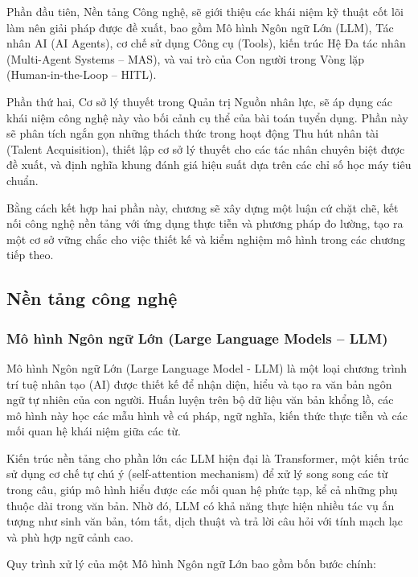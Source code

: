 \documentclass{article}
\begin{document}
Phần đầu tiên, Nền tảng Công nghệ, sẽ giới thiệu các khái niệm kỹ thuật cốt lõi làm nên giải pháp được đề xuất, bao gồm Mô hình Ngôn ngữ Lớn (LLM), Tác nhân AI (AI Agents), cơ chế sử dụng Công cụ (Tools), kiến trúc Hệ Đa tác nhân (Multi-Agent Systems – MAS), và vai trò của Con người trong Vòng lặp (Human-in-the-Loop – HITL).

Phần thứ hai, Cơ sở lý thuyết trong Quản trị Nguồn nhân lực, sẽ áp dụng các khái niệm công nghệ này vào bối cảnh cụ thể của bài toán tuyển dụng. Phần này sẽ phân tích ngắn gọn những thách thức trong hoạt động Thu hút nhân tài (Talent Acquisition), thiết lập cơ sở lý thuyết cho các tác nhân chuyên biệt được đề xuất, và định nghĩa khung đánh giá hiệu suất dựa trên các chỉ số học máy tiêu chuẩn.

Bằng cách kết hợp hai phần này, chương sẽ xây dựng một luận cứ chặt chẽ, kết nối công nghệ nền tảng với ứng dụng thực tiễn và phương pháp đo lường, tạo ra một cơ sở vững chắc cho việc thiết kế và kiểm nghiệm mô hình trong các chương tiếp theo.

\vspace{14pt}

\setcounter{subsection}{0}
\setcounter{table}{0}
\setcounter{figure}{0}
\subsection{Nền tảng công nghệ}

\subsubsection{Mô hình Ngôn ngữ Lớn (Large Language Models – LLM)}

Mô hình Ngôn ngữ Lớn (Large Language Model - LLM) là một loại chương trình trí tuệ nhân tạo (AI) được thiết kế để nhận diện, hiểu và tạo ra văn bản ngôn ngữ tự nhiên của con người. Huấn luyện trên bộ dữ liệu văn bản khổng lồ, các mô hình này học các mẫu hình về cú pháp, ngữ nghĩa, kiến thức thực tiễn và các mối quan hệ khái niệm giữa các từ.

Kiến trúc nền tảng cho phần lớn các LLM hiện đại là Transformer, một kiến trúc sử dụng cơ chế tự chú ý (self-attention mechanism) để xử lý song song các từ trong câu, giúp mô hình hiểu được các mối quan hệ phức tạp, kể cả những phụ thuộc dài trong văn bản. Nhờ đó, LLM có khả năng thực hiện nhiều tác vụ ấn tượng như sinh văn bản, tóm tắt, dịch thuật và trả lời câu hỏi với tính mạch lạc và phù hợp ngữ cảnh cao.

Quy trình xử lý của một Mô hình Ngôn ngữ Lớn bao gồm bốn bước chính:
\end{document}
